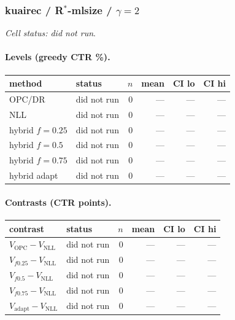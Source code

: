\documentclass[10pt,a4paper]{article}
\begin{document}
\subsubsection{kuairec / R$^*$-mlsize / $\gamma=2$}
\emph{Cell status: did not run}.
\paragraph{Levels (greedy CTR \%).}
{\centering\small\begin{tabular}{llrrrr}
\toprule method & status & $n$ & mean & CI lo & CI hi \\
\midrule
OPC/DR & did not run & 0 & --- & --- & --- \\
NLL & did not run & 0 & --- & --- & --- \\
hybrid $f{=}0.25$ & did not run & 0 & --- & --- & --- \\
hybrid $f{=}0.5$ & did not run & 0 & --- & --- & --- \\
hybrid $f{=}0.75$ & did not run & 0 & --- & --- & --- \\
hybrid adapt & did not run & 0 & --- & --- & --- \\
\bottomrule\end{tabular}\par}
\paragraph{Contrasts (CTR points).}
{\centering\small\begin{tabular}{llrrrr}
\toprule contrast & status & $n$ & mean & CI lo & CI hi \\
\midrule
$V_{\mathrm{OPC}}-V_{\mathrm{NLL}}$ & did not run & 0 & --- & --- & --- \\
$V_{f0.25}-V_{\mathrm{NLL}}$ & did not run & 0 & --- & --- & --- \\
$V_{f0.5}-V_{\mathrm{NLL}}$ & did not run & 0 & --- & --- & --- \\
$V_{f0.75}-V_{\mathrm{NLL}}$ & did not run & 0 & --- & --- & --- \\
$V_{\mathrm{adapt}}-V_{\mathrm{NLL}}$ & did not run & 0 & --- & --- & --- \\
\bottomrule\end{tabular}\par}
\end{document}
